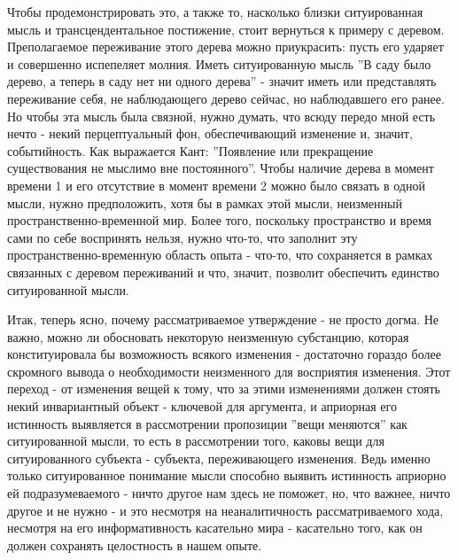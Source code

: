 \documentclass{article}
\begin{document}
Чтобы продемонстрировать это, а также то, насколько близки ситуированная мысль и трансцендентальное постижение, стоит вернуться к примеру с деревом. Преполагаемое переживание этого дерева можно приукрасить: пусть его ударяет и совершенно испепеляет молния. Иметь ситуированную мысль ''В саду было дерево, а теперь в саду нет ни одного дерева'' - значит иметь или представлять переживание себя, не наблюдающего дерево сейчас, но наблюдавшего его ранее. Но чтобы эта мысль была связной, нужно думать, что всюду передо мной есть нечто - некий перцептуальный фон, обеспечивающий изменение и, значит, событийность. Как выражается Кант: ''Появление или прекращение существования не мыслимо вне постоянного''. Чтобы наличие дерева в момент времени 1 и его отсутствие в момент времени 2 можно было связать в одной мысли, нужно предположить, хотя бы в рамках этой мысли, неизменный пространственно-временной мир. Более того, поскольку пространство и время сами по себе воспринять нельзя, нужно что-то, что заполнит эту пространственно-временную область опыта - что-то, что сохраняется в рамках связанных с деревом переживаний и что, значит, позволит обеспечить единство ситуированной мысли.

Итак, теперь ясно, почему рассматриваемое утверждение - не просто догма. Не важно, можно ли обосновать некоторую неизменную субстанцию, которая конституировала бы возможность всякого изменения - достаточно гораздо более скромного вывода о необходимости неизменного для восприятия изменения. Этот переход - от изменения вещей к тому, что за этими изменениями должен стоять некий инвариантный объект - ключевой для аргумента, и априорная его истинность выявляется в рассмотрении пропозиции ''вещи меняются'' как ситуированной мысли, то есть в рассмотрении того, каковы вещи для ситуированного субъекта - субъекта, переживающего изменения. Ведь именно только ситуированное понимание мысли способно выявить истинность априорно ей подразумеваемого - ничто другое нам здесь не поможет, но, что важнее, ничто другое и не нужно - и это несмотря на неаналитичность рассматриваемого хода, несмотря на его информативность касательно мира - касательно того, как он должен сохранять целостность в нашем опыте.
\end{document}
